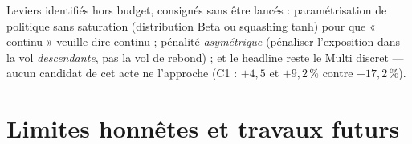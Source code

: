\documentclass[11pt,a4paper]{article}
\begin{document}
Leviers identifiés hors budget, consignés sans être lancés : paramétrisation de
politique sans saturation (distribution Beta ou squashing tanh) pour que
« continu » veuille dire continu ; pénalité \emph{asymétrique} (pénaliser
l'exposition dans la vol \emph{descendante}, pas la vol de rebond) ; et le
headline reste le Multi discret --- aucun candidat de cet acte ne l'approche
(C1 : $+4{,}5$ et $+9{,}2\,\%$ contre $+17{,}2\,\%$).

\section{Limites honnêtes et travaux futurs}
\label{sec:limites}
\end{document}
